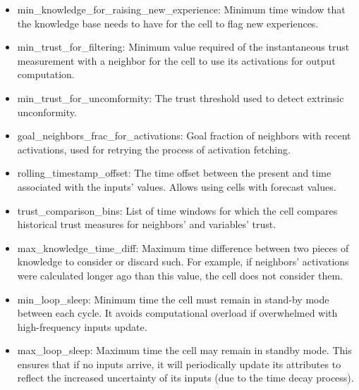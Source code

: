 \begin{itemize}
	\item min\_knowledge\_for\_raising\_new\_experience: Minimum time window that the knowledge base needs to have for the cell to flag new experiences.

    \item min\_trust\_for\_filtering: Minimum value required of the instantaneous trust measurement with a neighbor for the cell to use its activations for output computation.
	
    \item min\_trust\_for\_uncomformity: The trust threshold used to detect extrinsic unconformity.
	
    \item goal\_neighbors\_frac\_for\_activations: Goal fraction of neighbors with recent activations, used for retrying the process of activation fetching.
	
    \item rolling\_timestamp\_offset: The time offset between the present and time associated with the inputs' values. Allows using cells with forecast values.
	
    \item trust\_comparison\_bins: List of time windows for which the cell compares historical trust measures for neighbors' and variables' trust. 
	
    \item max\_knowledge\_time\_diff: Maximum time difference between two pieces of knowledge to consider or discard such. For example, if neighbors' activations were calculated longer ago than this value, the cell does not consider them.
	
    \item min\_loop\_sleep: Minimum time the cell must remain in stand-by mode between each cycle. It avoids computational overload if overwhelmed with high-frequency inputs update.
	
    \item max\_loop\_sleep: Maximum time the cell may remain in standby mode. This ensures that if no inputs arrive, it will periodically update its attributes to reflect the increased uncertainty of its inputs (due to the time decay process).
\end{itemize}
